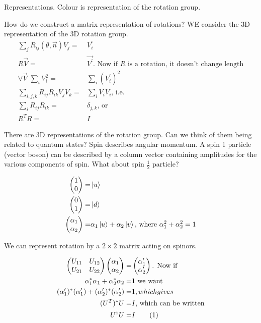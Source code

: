 \documentclass[]{article}
\newcommand\numberthis{\addtocounter{equation}{1}\tag{\theequation}}
\begin{document}
Representations. Colour is representation of the rotation group.

How do we construct a matrix representation of rotations? WE consider the 3D representation of the 3D rotation group.
\begin{align*}
\sum_j R_{ij}(\theta,\vec{n})V_j=&V_i^\prime \\
R \vec{V} =&\vec{V^\prime} \text{. Now if $R$ is a rotation, it doesn't change length}\\
\forall \vec{V} \; \sum_i V_i^2 =& \sum_i (V_i^\prime)^2\\
\sum_{i,j,k} R_{ij} R_{ik} V_j V_k =& \sum_i V_i V_i \text{, i.e.}\\
\sum_{i} R_{ij} R_{ik} =& \delta_{j,k} \text{, or}\\
R^T R =& I
\end{align*}

There are 3D representations of the rotation group. Can we think of them being related to quantum states? Spin describes angular momentum. A spin 1 particle (vector boson) can be described by a column vector containing amplitudes for the various components of spin. What about spin $\frac{1}{2}$ particle?

\begin{align*}
	\begin{pmatrix}
		1\\
		0
	\end{pmatrix}=& \ket{u}\\
	\begin{pmatrix}
		0\\
		1
	\end{pmatrix}=& \ket{d}\\
	\begin{pmatrix}
		\alpha_1\\
		\alpha_2
	\end{pmatrix}=& \alpha_1 \ket{u} + \alpha_2 \ket{v} \text{, where $\alpha_1^2+\alpha_2^2=1$}
\end{align*}

We can represent rotation by a $2\times2$ matrix acting on spinors.

\begin{align*}
	\begin{pmatrix}
		U_{11}&U_{12}\\
		U_{21}&U_{22}
	\end{pmatrix} 	\begin{pmatrix}
		\alpha_1\\
		\alpha_2
	\end{pmatrix} =& \begin{pmatrix}
		\alpha^\prime_1\\
		\alpha^\prime_2
	\end{pmatrix} \text{{. Now if}}\\
	\alpha^*_1 \alpha_1 + \alpha^*_2 \alpha_2 =& 1 \text{ we want}\\
	(\alpha^\prime_1)^* (\alpha^\prime_1) + (\alpha^\prime_2)^* (\alpha^\prime_2) =& 1 {, which gives}\\
	(U^T)^* U =& I \text{, which can be written} \\
	U^\dagger U =& I \numberthis \label{eq:unitary:2}
\end{align*}
\end{document}
